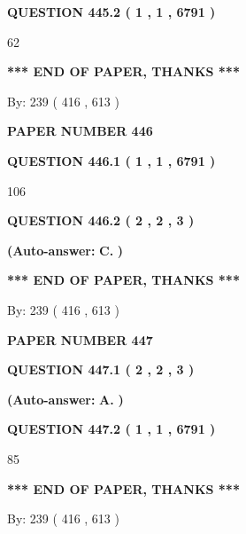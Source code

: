 \documentclass{ctexart}
\begin{document}
  
{\textbf{\large{QUESTION
445.2 
 ( 1 , 1 , 6791 )
}}}

62
   
   
   
   
\vspace{1.0in} 
{\textbf{\large{ *** END OF PAPER, THANKS *** }}} 
   
   
\hspace{1.0in} By: 
 239 ( 416 ,  613 )
   
   
   
   
\newpage 
\setcounter{page}{ 
   446001 } 
   
   
 {\textbf{ \Large{ PAPER NUMBER  446  }}}
   
   
   
   
  
  
{\textbf{\large{QUESTION
446.1 
 ( 1 , 1 , 6791 )
}}}

106
  
  
{\textbf{\large{QUESTION
446.2 
 ( 2 , 2 , 3 )
}}}
 
 
{\textbf{(Auto-answer:}}
{\textbf{\large{
C.}}}
{\textbf{)}}
 
 
   
   
   
   
\vspace{1.0in} 
{\textbf{\large{ *** END OF PAPER, THANKS *** }}} 
   
   
\hspace{1.0in} By: 
 239 ( 416 ,  613 )
   
   
   
   
\newpage 
\setcounter{page}{ 
   447001 } 
   
   
 {\textbf{ \Large{ PAPER NUMBER  447  }}}
   
   
   
   
  
  
{\textbf{\large{QUESTION
447.1 
 ( 2 , 2 , 3 )
}}}
 
 
{\textbf{(Auto-answer:}}
{\textbf{\large{
A.}}}
{\textbf{)}}
 
 
  
  
{\textbf{\large{QUESTION
447.2 
 ( 1 , 1 , 6791 )
}}}

85
   
   
   
   
\vspace{1.0in} 
{\textbf{\large{ *** END OF PAPER, THANKS *** }}} 
   
   
\hspace{1.0in} By: 
 239 ( 416 ,  613 )
   
   
   
\end{document}
